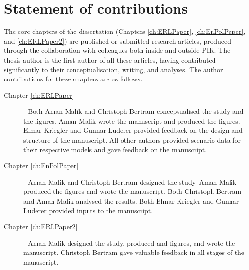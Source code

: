 \documentclass[../thesis.tex]{subfiles}
\begin{document}
\chapter*{Statement of contributions}

The core chapters of the dissertation (Chapters \ref{ch:ERLPaper}, \ref{ch:EnPolPaper}, and \ref{ch:ERLPaper2}) are published or submitted research articles, produced through the collaboration with colleagues both inside and outside PIK. The thesis author is the first author of all these articles, having contributed significantly to their conceptualisation, writing, and analyses. The author contributions for these chapters are as follows:

\begin{description}

\item [Chapter \ref{ch:ERLPaper}] - Both Aman Malik and Christoph Bertram conceptualised the study and the figures. Aman Malik wrote the manuscript and produced the figures. Elmar Kriegler and Gunnar Luderer provided feedback on the design and structure of the manuscript. All other authors provided scenario data for their respective models and gave feedback on the manuscript.

\item [Chapter \ref{ch:EnPolPaper}] - Aman Malik and Christoph Bertram designed the study. Aman Malik produced the figures and wrote the manuscript. Both Christoph Bertram and Aman Malik analysed the results. Both Elmar Kriegler and Gunnar Luderer provided inputs to the manuscript.

\item [Chapter \ref{ch:ERLPaper2}] - Aman Malik designed the study, produced and figures, and wrote the manuscript. Christoph Bertram gave valuable feedback in all stages of the manuscript. 

\end{description}
\end{document}
